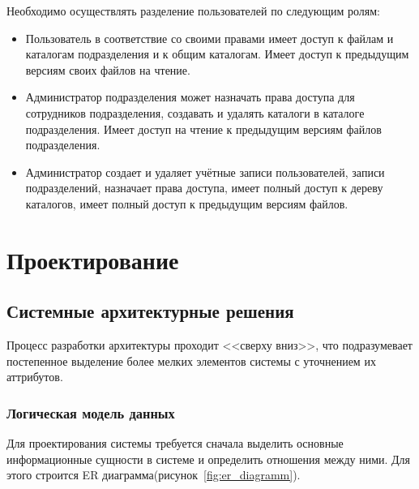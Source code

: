 \documentclass[utf8,usehyperref,12pt]{G7-32}
\begin{document}
Необходимо осуществлять разделение пользователей по следующим ролям:	
\begin{itemize}
\item Пользователь 	в соответствие со своими правами имеет 	доступ к файлам и каталогам подразделения и к общим каталогам. Имеет доступ к предыдущим версиям своих файлов на чтение. 		
\item Администратор подразделения может назначать права доступа для сотрудников подразделения, создавать и удалять каталоги в каталоге подразделения. Имеет доступ на чтение к предыдущим версиям файлов подразделения.
\item Администратор создает и удаляет учётные записи пользователей, записи подразделений, назначает права доступа, имеет полный 	доступ к дереву каталогов, имеет полный доступ к предыдущим версиям файлов.
\end{itemize}




\chapter{Проектирование}
\section{Системные архитектурные решения}
Процесс разработки архитектуры проходит <<сверху вниз>>, что подразумевает постепенное выделение более мелких элементов системы с уточнением их аттрибутов.

\subsection{Логическая модель данных}

Для проектирования системы требуется сначала выделить основные информационные сущности в системе и определить отношения между ними. Для этого строится ER диаграмма(рисунок~\ref{fig:er_diagramm}).
\end{document}
